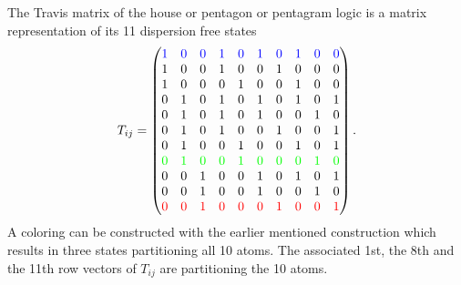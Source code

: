 \documentclass[%
12pt,
prereprint,
showpacs,
showkeys,
preprintnumbers,
amsmath,amssymb,
aps,
pra,
longbibliography,
notitlepage
]{revtex4-1}
\theoremstyle{definition}
\begin{document}
        The Travis matrix of the house or pentagon or pentagram logic
        is a matrix representation of its 11 dispersion free states~\cite{wright:pent}
        \begin{equation}
                T_{ij}=\begin{pmatrix}
                        {\color{blue}1}& {\color{blue}0}& {\color{blue}0}& {\color{blue}1}& {\color{blue}0}& {\color{blue}1}& {\color{blue}0}& {\color{blue}1}& {\color{blue}0}& {\color{blue}0}  \\
                        1& 0& 0& 1& 0& 0& 1& 0& 0& 0  \\
                        1& 0& 0& 0& 1& 0& 0& 1& 0& 0  \\
                        0& 1& 0& 1& 0& 1& 0& 1& 0& 1  \\
                        0& 1& 0& 1& 0& 1& 0& 0& 1& 0  \\
                        0& 1& 0& 1& 0& 0& 1& 0& 0& 1  \\
                        0& 1& 0& 0& 1& 0& 0& 1& 0& 1  \\
                        {\color{green}0}& {\color{green}1}& {\color{green}0}& {\color{green}0}& {\color{green}1}& {\color{green}0}& {\color{green}0}& {\color{green}0}& {\color{green}1}& {\color{green}0}  \\
                        0& 0& 1& 0& 0& 1& 0& 1& 0& 1  \\
                        0& 0& 1& 0& 0& 1& 0& 0& 1& 0  \\
                        {\color{red}0}& {\color{red}0}& {\color{red}1}& {\color{red}0}& {\color{red}0}& {\color{red}0}& {\color{red}1}& {\color{red}0}& {\color{red}0}& {\color{red}1}
                \end{pmatrix}
                .
        \end{equation}
        A coloring can be constructed with the earlier mentioned construction
        which results in three states partitioning all 10 atoms.
        The associated 1st, the 8th and the 11th row vectors
        of $T_{ij}$  are partitioning the 10 atoms.
\end{document}
